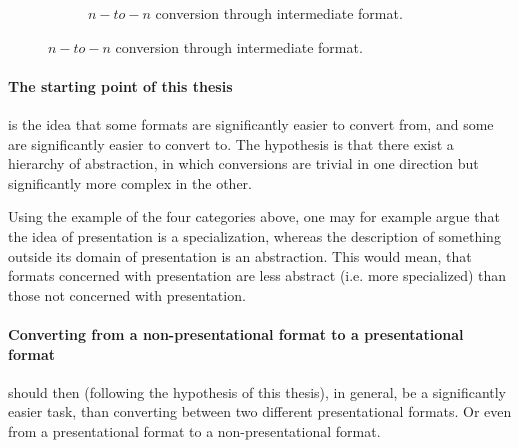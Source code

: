 \documentclass{scrreprt}
\begin{document}
\begin{figure}[h]
\begin{subfigure}{.5\textwidth}

    \caption{$n-to-n$ conversion through intermediate format.}
    \label{fig:n-to-n-conversion-boxes-with-intermediate-format}
  \end{subfigure}
  
  \label{fig:n-to-n-conversion-boxes}
\end{figure}



\paragraph{The starting point of this thesis} is the idea that some formats are significantly easier to convert from, and some are significantly easier to convert to. The hypothesis is that there exist a hierarchy of abstraction, in which conversions are trivial in one direction but significantly more complex in the other. 

Using the example of the four categories above, one may for example argue that the idea of presentation is a specialization, whereas the description of something outside its domain of presentation is an abstraction. This would mean, that formats concerned with presentation are less abstract (i.e. more specialized) than those not concerned with presentation.

\paragraph{Converting from a non-presentational format to a presentational format} should then (following the hypothesis of this thesis), in general, be a significantly easier task, than converting between two different presentational formats. Or even from a presentational format to a non-presentational format.
\end{document}
